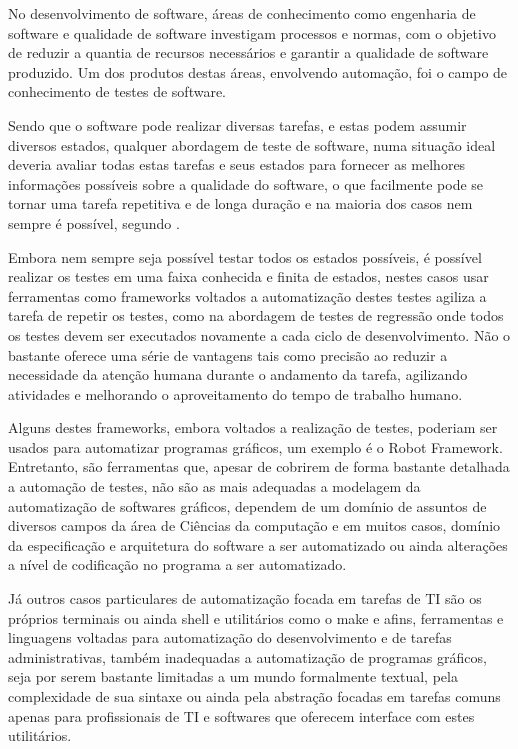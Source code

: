 \documentclass[12pt]{article}
\begin{document}
	No desenvolvimento de software, áreas de conhecimento como engenharia de software e qualidade de software
investigam processos e normas, com o objetivo de reduzir a quantia de recursos necessários e garantir a qualidade de
software produzido. Um dos produtos destas áreas, envolvendo automação, foi o campo de conhecimento de testes de software.

Sendo que o software pode realizar diversas tarefas, e estas podem assumir diversos estados, qualquer abordagem
de teste de software, numa situação ideal deveria avaliar todas estas tarefas e seus estados para fornecer as melhores
informações possíveis sobre a qualidade do software, o que facilmente pode se tornar uma tarefa repetitiva e de longa
duração e na maioria dos casos nem sempre é possível, segundo \cite[pag. 10]{myers2011art}.

Embora nem sempre seja possível testar todos os estados possíveis, é possível realizar os testes em uma faixa
conhecida e finita de estados, nestes casos usar ferramentas como frameworks voltados a automatização destes testes
agiliza a tarefa de repetir os testes, como na abordagem de testes de regressão onde todos os testes devem ser
executados novamente a cada ciclo de desenvolvimento. Não o bastante oferece uma série de vantagens tais como precisão ao reduzir a necessidade da atenção humana durante o andamento da tarefa, agilizando atividades e melhorando o aproveitamento do tempo de trabalho humano.

Alguns destes frameworks, embora voltados a realização de testes, poderiam ser usados para automatizar programas gráficos, um exemplo é o Robot Framework. Entretanto, são ferramentas que, apesar de cobrirem de forma bastante detalhada a automação de testes, não são as mais adequadas a modelagem da automatização de softwares gráficos, dependem de um domínio de assuntos de diversos campos da área de Ciências da computação e em muitos casos, domínio da especificação e arquitetura do software a ser automatizado ou ainda alterações a nível de codificação no programa a ser automatizado.

Já outros casos particulares de automatização focada em tarefas de TI são os próprios terminais ou ainda shell e utilitários como o make e afins, ferramentas e linguagens voltadas para automatização do desenvolvimento e de tarefas administrativas, também inadequadas a automatização de programas gráficos, seja por serem bastante limitadas a um mundo formalmente textual, pela complexidade de sua sintaxe ou ainda pela abstração focadas em tarefas comuns apenas para profissionais de TI e softwares que oferecem interface com estes utilitários.
\end{document}

